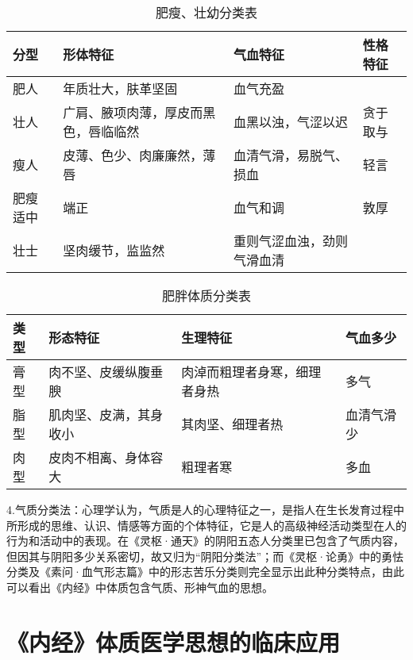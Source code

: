 \documentclass[draft,12pt]{ctexbook}
\begin{document}
\begin{table}[htb!p]%
	\centering
	\caption{肥瘦、壮幼分类表}\label{tab:肥瘦、壮幼分类表}
	\begin{tabu}to.87
		\toprule
		\rowfont[c]{}
		分型     & 形体特征                             & 气血特征                   & 性格特征 \\
		\midrule
		肥人     & 年质壮大，肤革坚固                   & 血气充盈                   &  \\
		壮人     & 广肩、腋项肉薄，厚皮而黑色，唇临临然 & 血黑以浊，气涩以迟         & 贪于取与 \\
		瘦人     & 皮薄、色少、肉廉廉然，薄唇           & 血清气滑，易脱气、损血     & 轻言 \\
		肥瘦适中 & 端正                                 & 血气和调                   & 敦厚 \\
		壮士     & 坚肉缓节，监监然                     & 重则气涩血浊，劲则气滑血清 & \\
		\bottomrule
	\end{tabu}
\end{table}

\begin{table}[htb!p]%
	\centering
	\caption{肥胖体质分类表}\label{tab:肥胖体质分类表}
	\begin{tabu}to.87
		\toprule
		\rowfont[c]{}类型 & 形态特征               & 生理特征                     & 气血多少 \\
		\midrule
					 膏型 & 肉不坚、皮缓纵腹垂腴   & 肉淖而粗理者身寒，细理者身热 & 多气 \\
					 脂型 & 肌肉坚、皮满，其身收小 & 其肉坚、细理者热             & 血清气滑少 \\
					 肉型 & 皮肉不相离、身体容大   & 粗理者寒                     & 多血 \\
		\bottomrule
	\end{tabu}
\end{table}
4.气质分类法：心理学认为，气质是人的心理特征之一，是指人在生长发育过程中所形成的思维、认识、情感等方面的个体特征，它是人的高级神经活动类型在人的行为和活动中的表现。在《灵枢·通天》的阴阳五态人分类里已包含了气质内容，但因其与阴阳多少关系密切，故又归为“阴阳分类法”；而《灵枢·论勇》中的勇怯分类及《素问·血气形志篇》中的形志苦乐分类则完全显示出此种分类特点，由此可以看出《内经》中体质包含气质、形神气血的思想。

\section{《内经》体质医学思想的临床应用}%
\end{document}
